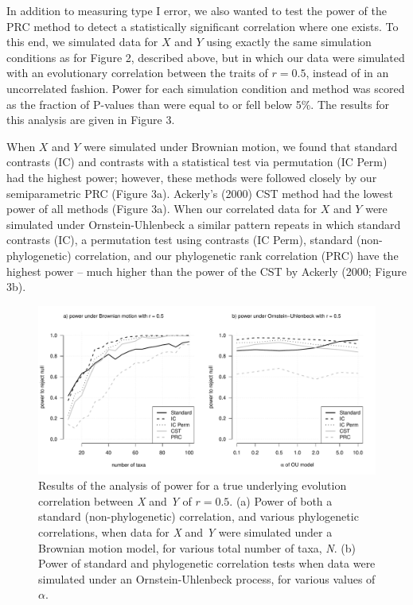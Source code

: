 \documentclass[fleqn,10pt,lineno]{wlpeerj} %
\begin{document}
In addition to measuring type I error, we also wanted to test the power of the PRC method to detect a statistically significant correlation where one exists. To this end, we simulated data for \(X\) and \(Y\) using exactly the same simulation conditions as for Figure 2, described above, but in which our data were simulated with an evolutionary correlation between the traits of \(r = 0.5\), instead of in an uncorrelated fashion. Power for each simulation condition and method was scored as the fraction of P-values than were equal to or fell below 5\%. The results for this analysis are given in Figure 3.

When \(X\) and \(Y\) were simulated under Brownian motion, we found that standard contrasts (IC) and contrasts with a statistical test via permutation (IC Perm) had the highest power; however, these methods were followed closely by our semiparametric PRC (Figure 3a). Ackerly's (2000) CST method had the lowest power of all methods (Figure 3a). When our correlated data for \(X\) and \(Y\) were simulated under Ornstein-Uhlenbeck a similar pattern repeats in which standard contrasts (IC), a permutation test using contrasts (IC Perm), standard (non-phylogenetic) correlation, and our phylogenetic rank correlation (PRC) have the highest power -- much higher than the power of the CST by Ackerly (2000; Figure 3b).

\begin{figure}
\includegraphics[width=1\linewidth]{Harmon-and-Revell_NonParametricPCM.PeerJ_files/figure-latex/Harmon-fig3-1} \caption{Results of the analysis of power for a true underlying evolution correlation between \emph{X} and \emph{Y} of $r = 0.5$. (a) Power of both a standard (non-phylogenetic) correlation, and various phylogenetic correlations, when data for \emph{X} and \emph{Y} were simulated under a Brownian motion model, for various total number of taxa, \emph{N}. (b) Power of standard and phylogenetic correlation tests when data were simulated under an Ornstein-Uhlenbeck process, for various values of $\alpha$.}\label{fig:Harmon-fig3}
\end{figure}
\end{document}
